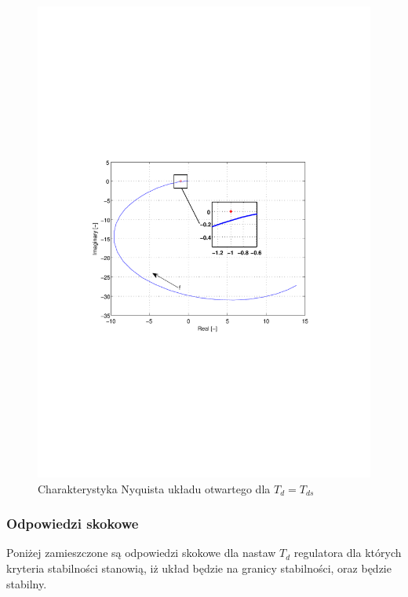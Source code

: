 \documentclass[12pt]{article}
\begin{document}
\begin{figure}[!htb]
	\begin{center}
		\includegraphics[trim=5cm 9cm 5cm 9cm]{../res/img/2-1-3_nyq.pdf} 
	\end{center}
	\caption{Charakterystyka Nyquista układu otwartego dla $T_{d}=T_{ds}$}
\end{figure}

\newpage

\subsubsection{Odpowiedzi skokowe}

Poniżej zamieszczone są odpowiedzi skokowe dla nastaw $T_d$ regulatora dla
których kryteria stabilności stanowią, iż układ będzie na granicy stabilności, oraz
będzie stabilny.
\end{document}
